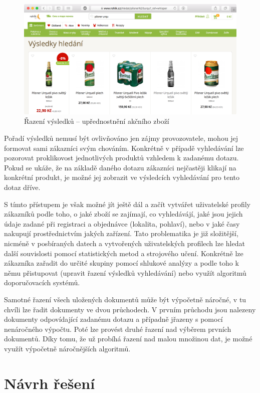 \documentclass[FM,DP]{tulthesis}
\begin{document}
\begin{figure}[h]
\center
\includegraphics[width=\textwidth]{relevance.png}
\caption{Řazení výsledků -- upřednostnění akčního zboží}
\label{relevance}
\end{figure}

Pořadí výsledků nemusí být ovlivňováno jen zájmy provozovatele, mohou jej formovat
sami zákazníci svým chováním. Konkrétně v případě vyhledávání lze pozorovat proklikovost
jednotlivých produktů vzhledem k zadanému dotazu. Pokud se ukáže, že na základě
daného dotazu zákazníci nejčastěji klikají na konkrétní produkt, je možné jej zobrazit 
ve výsledcích vyhledávání pro tento dotaz dříve. 

S tímto přístupem je však možné jít ještě dál a začít vytvářet uživatelské profily zákazníků podle toho, 
o jaké zboží se zajímají, co vyhledávájí, jaké jsou jejich údaje zadané při registraci a objednávce 
(lokalita, pohlaví), nebo v jaké časy nakupují prostřednictvím jakých zařízení. Tato problematika je již
složitější, nicméně v posbíraných datech a vytvořených uživatelských profilech lze hledat další 
souvislosti pomocí statistických metod a strojového učení. Konkrétně lze zákazníka zařadit do určité 
skupiny pomocí shlukové analýzy a podle toho k němu přistupovat (upravit řazení výsledků vyhledávání) 
nebo využít algoritmů doporučovacích systémů.

Samotné řazení všech uložených dokumentů může být výpočetně náročné, v tu chvíli lze řadit
dokumenty ve dvou průchodech. V prvním průchodu jsou nalezeny dokumenty odpovídající zadanému 
dotazu a případně jřazeny s pomocí nenáročného výpočtu. Poté lze provést druhé řazení nad výběrem 
prvních dokumentů. Díky tomu, že už probíhá řazení nad malou množinou dat, je možné využít 
výpočetně náročnějších algoritmů.


\chapter{Návrh řešení}
\end{document}
